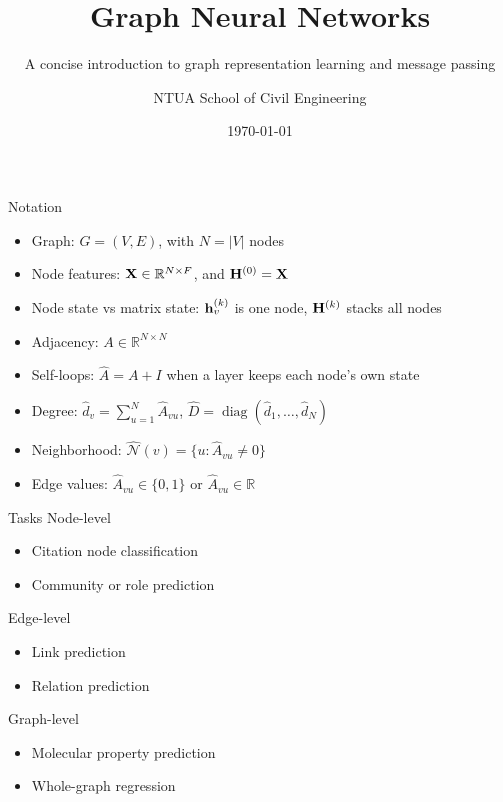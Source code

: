\documentclass[10pt,aspectratio=169]{ntuabeamer}
\title{Graph Neural Networks}
\subtitle{A concise introduction to graph representation learning and message passing}
\author{NTUA School of Civil Engineering}
\date{\today}
\begin{document}
\begin{frame}[plain]
  \makepresentationtitle
\end{frame}


\begin{frame}{Notation}
  \small
  \begin{itemize}
    \item Graph: \(G = (V, E)\), with \(N = |V|\) nodes
    \item Node features: \(\mathbf{X} \in \mathbb{R}^{N \times F}\), and \(\mathbf{H}^{(0)} = \mathbf{X}\)
    \item Node state vs matrix state: \(\mathbf{h}_{v}^{(k)}\) is one node, \(\mathbf{H}^{(k)}\) stacks all nodes
    \item Adjacency: \(A \in \mathbb{R}^{N \times N}\)
    \item Self-loops: \(\hat{A} = A + I\) when a layer keeps each node's own state
    \item Degree: \(\hat{d}_v = \sum_{u=1}^{N} \hat{A}_{vu}\), \(\hat{D} = \operatorname{diag}(\hat{d}_1, \dots, \hat{d}_N)\)
    \item Neighborhood: \(\hat{\mathcal N}(v) = \{u : \hat{A}_{vu} \neq 0\}\)
    \item Edge values: \(\hat{A}_{vu} \in \{0, 1\}\) or \(\hat{A}_{vu} \in \mathbb{R}\)
  \end{itemize}
\end{frame}

\begin{frame}{Tasks}
  \textcolor{ntuablue}{Node-level}
  \begin{itemize}
    \item Citation node classification
    \item Community or role prediction
  \end{itemize}

  \textcolor{ntuablue}{Edge-level}
  \begin{itemize}
    \item Link prediction
    \item Relation prediction
  \end{itemize}

  \textcolor{ntuablue}{Graph-level}
  \begin{itemize}
    \item Molecular property prediction
    \item Whole-graph regression
  \end{itemize}
\end{frame}
\end{document}
